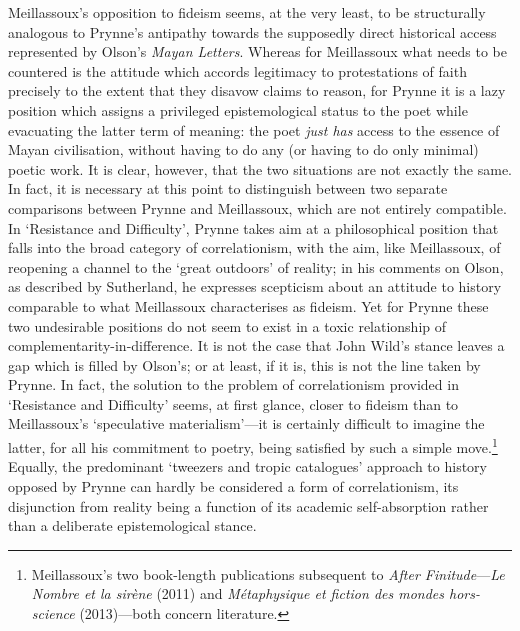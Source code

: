 \documentclass[]{article}
\begin{document}
Meillassoux's opposition to fideism seems, at the very least, to be
structurally analogous to Prynne's antipathy towards the supposedly
direct historical access represented by Olson's \emph{Mayan Letters}.
Whereas for Meillassoux what needs to be countered is the attitude which
accords legitimacy to protestations of faith precisely to the extent
that they disavow claims to reason, for Prynne it is a lazy position
which assigns a privileged epistemological status to the poet while
evacuating the latter term of meaning: the poet \emph{just has} access
to the essence of Mayan civilisation, without having to do any (or
having to do only minimal) poetic work. It is clear, however, that the
two situations are not exactly the same. In fact, it is necessary at
this point to distinguish between two separate comparisons between
Prynne and Meillassoux, which are not entirely compatible. In
`Resistance and Difficulty', Prynne takes aim at a philosophical
position that falls into the broad category of correlationism, with the
aim, like Meillassoux, of reopening a channel to the `great outdoors' of
reality; in his comments on Olson, as described by Sutherland, he
expresses scepticism about an attitude to history comparable to what
Meillassoux characterises as fideism. Yet for Prynne these two
undesirable positions do not seem to exist in a toxic relationship of
complementarity-in-difference. It is not the case that John Wild's
stance leaves a gap which is filled by Olson's; or at least, if it is,
this is not the line taken by Prynne. In fact, the solution to the
problem of correlationism provided in `Resistance and Difficulty' seems,
at first glance, closer to fideism than to Meillassoux's `speculative
materialism'---it is certainly difficult to imagine the latter, for all
his commitment to poetry, being satisfied by such a simple
move.\footnote{Meillassoux's two book-length publications subsequent to
  \emph{After Finitude}---\emph{Le Nombre et la sirène} (2011) and
  \emph{Métaphysique et fiction des mondes hors-science} (2013)---both
  concern literature.} Equally, the predominant `tweezers and tropic
catalogues' approach to history opposed by Prynne can hardly be
considered a form of correlationism, its disjunction from reality being
a function of its academic self-absorption rather than a deliberate
epistemological stance.
\end{document}
